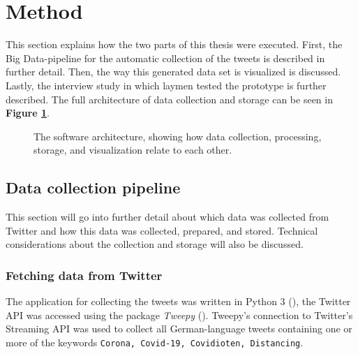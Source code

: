 \section{Method}
This section explains how the two parts of this thesis were executed. First, the Big Data-pipeline for the automatic collection of the tweets is described in further detail. Then, the way this generated data set is visualized is discussed. Lastly, the interview study in which laymen tested the prototype is further described. The full architecture of data collection and storage can be seen in \textbf{Figure \ref{fig:architecture}}.

\begin{figure}[htb]
    \caption{The software architecture, showing how data collection, processing, storage, and visualization relate to each other.}
    \label{fig:architecture}
\end{figure}

\subsection{Data collection pipeline}
This section will go into further detail about which data was collected from Twitter and how this data was collected, prepared, and stored. Technical considerations about the collection and storage will also be discussed.

\subsubsection{Fetching data from Twitter} \label{sec:fetchedData}
The application for collecting the tweets was written in Python 3 (\cite{10.5555/1593511}), the Twitter API was accessed using the package \emph{Tweepy} (\cite{roesslein2020tweepy}). Tweepy's connection to Twitter's Streaming API was used to collect all German-language tweets containing one or more of the keywords \verb+Corona, Covid-19, Covidioten, Distancing+.

